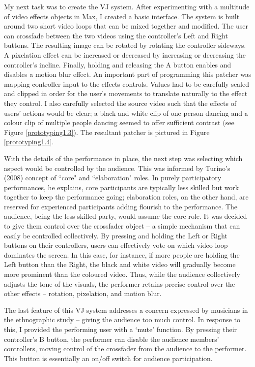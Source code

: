 My next task was to create the VJ system. After experimenting with a multitude of video effects objects in Max, I created a basic interface. The system is built around two short video loops that can be mixed together and modified. The user can crossfade between the two videos using the controller's Left and Right buttons. The resulting image can be rotated by rotating the controller sideways. A pixelation effect can be increased or decreased by increasing or decreasing the controller's incline. Finally, holding and releasing the A button enables and disables a motion blur effect. An important part of programming this patcher was mapping controller input to the effects controls. Values had to be carefully scaled and clipped in order for the user's movements to translate naturally to the effect they control. I also carefully selected the source video such that the effects of users' actions would be clear; a black and white clip of one person dancing and a colour clip of multiple people dancing seemed to offer sufficient contrast (see Figure \ref{prototyping1.3}). The resultant patcher is pictured in Figure \ref{prototyping1.4}.

With the details of the performance in place, the next step was selecting which aspect would be controlled by the audience. This was informed by Turino's (2008) concept of ``core" and ``elaboration" roles. In purely participatory performances, he explains, core participants are typically less skilled but work together to keep the performance going; elaboration roles, on the other hand, are reserved for experienced participants adding flourish to the performance. The audience, being the less-skilled party, would assume the core role. It was decided to give them control over the crossfader object -- a simple mechanism that can easily be controlled collectively. By pressing and holding the Left or Right buttons on their controllers, users can effectively vote on which video loop dominates the screen. In this case, for instance, if more people are holding the Left button than the Right, the black and white video will gradually become more prominent than the coloured video. Thus, while the audience collectively adjusts the tone of the visuals, the performer retains precise control over the other effects -- rotation, pixelation, and motion blur.

The last feature of this VJ system addresses a concern expressed by musicians in the ethnographic study -- giving the audience too much control.  In response to this, I provided the performing user with a `mute' function. By pressing their controller's B button, the performer can disable the audience members' controllers, moving control of the crossfader from the audience to the performer. This button is essentially an on/off switch for audience participation.

